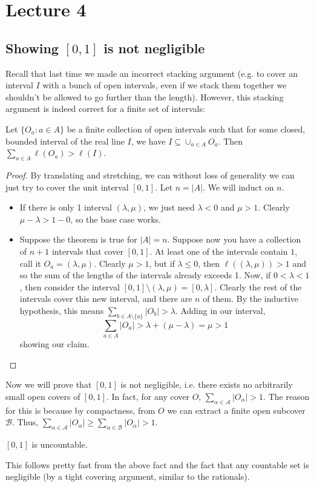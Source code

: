 \section{Lecture 4}
\subsection{Showing $[0,1]$ is not negligible}
Recall that last time we made an incorrect stacking argument (e.g. to cover an interval $I$ with a bunch of open intervals, even if we stack them together we shouldn't be allowed to go further than the length). However, this stacking argument is indeed correct for
a finite set of intervals:
\begin{theorem}
    Let $\{O_a: a \in A\}$ be a finite collection of open intervals such that for some closed, bounded interval of the real line
    $I$, we have $I \subseteq \cup_{a \in A} O_a$. Then $\sum_{a \in A} \ell(O_a) > \ell(I)$.
    \begin{proof}
        By translating and stretching, we can without loss of generality we can just try to cover the unit interval $[0, 1]$.
        Let $n = |A|$. We will induct on $n$. \begin{itemize}
            \item If there is only 1 interval $(\lambda, \mu)$, we just need $\lambda < 0$ and $ \mu > 1$. Clearly $\mu - \lambda > 1 - 0$, so the base case works.
            \item Suppose the theorem is true for $|A| = n$. Suppose now
            you have a collection of $n + 1$ intervals that cover $[0, 1]$. At least one of the intervals contain $1$, call it $O_a = (\lambda, \mu)$.
            Clearly $\mu > 1$, but if $\lambda \leq 0$, then $\ell((\lambda, \mu)) > 1$ and so the sum of the lengths of the intervals already exceeds 1.
            Now, if $0 < \lambda < 1$, then consider the interval $[0,1] \setminus (\lambda, \mu) = [0, \lambda]$. Clearly the rest of the intervals cover this new interval,
            and there are $n$ of them. By the inductive hypothesis, this means $\sum_{b \in A \setminus \{a\}} |O_b| > \lambda$.
            Adding in our interval, 
            \[ \sum_{a \in A} |O_a| > \lambda + (\mu - \lambda) = \mu > 1 \]
            showing our claim.
        \end{itemize}
    \end{proof}
\end{theorem}
Now we will prove that $[0,1]$ is not negligible, i.e. there exists no arbitrarily small open covers of $[0, 1]$. In fact, for any cover $O$,
$\sum_{\alpha \in \mathcal{A}} |O_{\alpha}| > 1$. The reason for this is because by compactness, from $O$ we can extract a finite open subcover $\mathcal{B}$.
Thus, $\sum_{\alpha \in \mathcal{A}} |O_{\alpha}| \geq \sum_{\alpha \in \mathcal{B}} |O_{\alpha}| > 1$.
\begin{corollary}
    \([0,1]\) is uncountable.
\end{corollary}
This follows pretty fast from the above fact and the fact that any countable set is negligible (by a tight covering argument, similar to the rationals).
